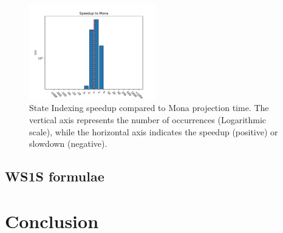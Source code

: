 \documentclass[pdflatex,sn-mathphys-num]{sn-jnl}%
\theoremstyle{thmstyleone}%
\theoremstyle{thmstyletwo}%
\theoremstyle{thmstylethree}%
\begin{document}
            \begin{figure}[h!]
                \centering
                \includegraphics[width=0.49\textwidth]{Figures/projection-first-speedup.pdf}
                \caption{State Indexing speedup compared to Mona projection time. The vertical axis represents the number of occurrences (Logarithmic scale), while the horizontal axis indicates the speedup (positive) or slowdown (negative).}
                \label{figure:projection_last_speedup}
            \end{figure}
    \subsection{WS1S formulae}

\section{Conclusion}








\end{document}
